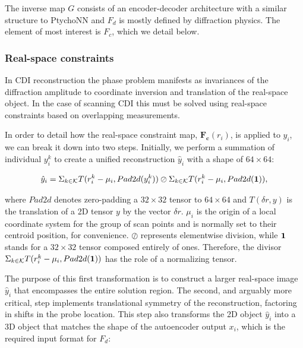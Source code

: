 \documentclass[sn-mathphys]{sn-jnl}%
\theoremstyle{thmstyleone}%
\theoremstyle{thmstyletwo}%
\theoremstyle{thmstylethree}%
\begin{document}
The inverse map $G$ consists of an encoder-decoder architecture with a similar structure to PtychoNN and $F_d$ is mostly defined by diffraction physics. The element of most interest is $F_c$, which we detail below.


\subsubsection{Real-space constraints}
In CDI reconstruction the phase problem manifests as invariances of the diffraction amplitude to coordinate inversion and translation of the real-space object. In the case of scanning CDI this must be solved using real-space constraints based on overlapping measurements.

In order to detail how the real-space constraint map, $\mathbf{F_c}(r_i)$, is applied to $y_i$, we can break it down into two steps. Initially, we perform a summation of individual $y_i^k$ to create a unified reconstruction $\hat{y}_i$ with a shape of $64 \times 64$:
%


\begin{equation} 
\hat{y}_i = \Sigma_{k \in \mathcal{K}} T(r_i^k - \mu_i, Pad2d(y_i^k))
\oslash
\Sigma_{k \in \mathcal{K}} T(r_i^k - \mu_i, Pad2d(\bf{1})), 
\label{eq:1}
\end{equation}

where $Pad2d$ denotes zero-padding a $32 \times 32$ tensor to $64 \times 64$ and $T(\delta r, y)$ is the translation of a 2D tensor $y$ by the vector $\delta r$. $\mu_i$ is the origin of a local coordinate system for the group of scan points and is normally set to their centroid position, for convenience. $\oslash$ represents elementwise division, while $\bf{1}$ stands for a $32 \times 32$ tensor composed entirely of ones. Therefore, the divisor $\Sigma_{k \in \mathcal{K}} T(r_i^k - \mu_i, Pad2d(\bf{1}))$ has the role of a normalizing tensor.

The purpose of this first transformation is to construct a larger real-space image $\hat{y}_i$ that encompasses the entire solution region. The second, and arguably more critical, step implements translational symmetry of the reconstruction, factoring in shifts in the probe location. This step also transforms the 2D object $\hat{y}_i$ into a 3D object that matches the shape of the autoencoder output $x_i$, which is the required input format for $F_d$:
\end{document}
